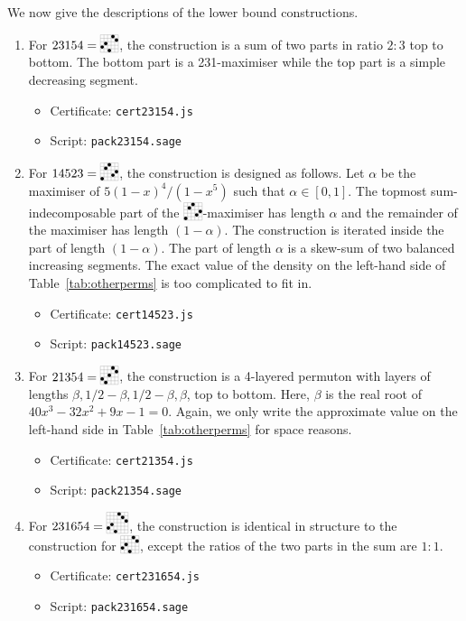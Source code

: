 We now give the descriptions of the lower bound constructions.
\begin{enumerate}
\item For $23154 = \bcaoba$, the construction is a sum of two parts in ratio $2:3$ top to bottom. The bottom part is a 231-maximiser while the top part is a simple decreasing segment.
  \begin{itemize}
  \item Certificate: \texttt{cert23154.js}
  \item Script: \texttt{pack23154.sage}
  \end{itemize}
\item For $14523 = \aobamba$, the construction is designed as follows. Let $\alpha$ be the maximiser of $5(1-x)^4/(1-x^5)$ such that $\alpha \in [0,1]$. The topmost sum-indecomposable part of the $\aobamba$-maximiser has length $\alpha$ and the remainder of the maximiser has length $(1-\alpha)$. The construction is iterated inside the part of length $(1-\alpha)$. The part of length $\alpha$ is a skew-sum of two balanced increasing segments. The exact value of the density on the left-hand side of Table~\ref{tab:otherperms} is too complicated to fit in.
  \begin{itemize}
  \item Certificate: \texttt{cert14523.js}
  \item Script: \texttt{pack14523.sage}
  \end{itemize}
\item For $21354 = \baoaoba$, the construction is a 4-layered permuton with layers of lengths $\beta, 1/2-\beta, 1/2-\beta, \beta$, top to bottom. Here, $\beta$ is the real root of $40x^3 - 32x^2 + 9x - 1 = 0$. Again, we only write the approximate value on the left-hand side in Table~\ref{tab:otherperms} for space reasons.
  \begin{itemize}
  \item Certificate: \texttt{cert21354.js}
  \item Script: \texttt{pack21354.sage}
  \end{itemize}
\item For $231654 = \bcaocba$, the construction is identical in structure to the construction for $\bcaoba$, except the ratios of the two parts in the sum are $1:1$.
  \begin{itemize}
  \item Certificate: \texttt{cert231654.js}
  \item Script: \texttt{pack231654.sage}
  \end{itemize}

\end{enumerate}

